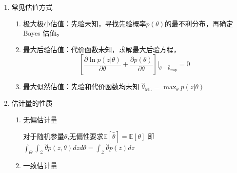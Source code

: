 \documentclass{article}
\def\E{\mathbb{E}}
\def\R{\mathbb{R}}
\def\Z{\mathcal{Z}}
\begin{document}
\begin{enumerate}
\begin{enumerate}[label=(\arabic*)]
\begin{proof}
\begin{align}
    \bar{R}(z) & = \int_{\R} C(\theta-\hat{\theta})p(\theta|z)d\theta \label{eq:Rf1}\\
                &  = \int_{\R} C(\theta-\hat{\theta})p(2\hat{\theta}_{\mathrm{ms}}-\theta|z)d\theta\nonumber\\
                &  = \int_{\R} C(2\hat{\theta}_{\mathrm{ms}}-\theta-\hat{\theta})p(\theta|z)d\theta\nonumber\\
                &  = \int_{\R} C(-2\hat{\theta}_{\mathrm{ms}}+\theta+\hat{\theta})p(\theta|z)d\theta\label{eq:Rf2}
\end{align}
对$\eqref{eq:Rf1}$ 和 $\eqref{eq:Rf2}$ 作平均得：
\begin{align*}
\bar{R}(z) & = \int_{\R} \frac{1}{2} \left(C(\theta-\hat{\theta})+C(-2\hat{\theta}_{\mathrm{ms}}+\theta+\hat{\theta})\right)p(\theta|z)d\theta \\
           & \geq  \int_{\R} C(\theta-\hat{\theta}_{\mathrm{ms}}) p(\theta|z)d\theta
\end{align*}
上式右端和$\hat{\theta}$无关，当 $\theta-\hat{\theta} = -2\hat{\theta}_{\mathrm{ms}}+\theta+\hat{\theta} $ 时不等式成立，即 $\hat{\theta}=\hat{\theta}_{\mathrm{ms}}$
\end{proof}
\item 对称非下凸代价
\end{enumerate}
\item 常见估值方式
\begin{enumerate}[label=(\alph*)]
\item 极大极小估值：先验未知，寻找先验概率$p(\theta)$的最不利分布，再确定 Bayes 估值。
\item 最大后验估值：代价函数未知，求解最大后验方程，
\begin{equation}\label{eq:max_posterior_eq}
\left[\frac{\partial \ln p(z|\theta)}{\partial \theta} + \frac{\partial p(\theta)}{\partial \theta} \right]{\bigg\rvert}_{\theta=\hat{\theta}_{\mathrm{map}}}=0
\end{equation}
\item 最大似然估值：先验和代价函数均未知 $\hat{\theta}_{\mathrm{ML}} = \displaystyle\max_{\theta} p(z|\theta)$
\end{enumerate}
\item 估计量的性质
\begin{enumerate}[label=(\alph*)]
\item 无偏估计量

对于随机参量$\theta$,无偏性要求$\E[\hat{\theta}]=\E[\theta]$
即$\int_{\Theta}\int_{\mathcal{Z}} \hat{\theta} p(z,\theta) dzd\theta = \int_{\Z}\hat{\theta} p(z)dz$
\item 一致估计量


\end{enumerate}
\end{enumerate}
\end{document}
